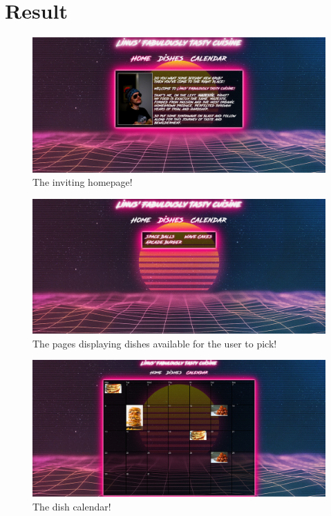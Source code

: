 \documentclass[a4paper]{scrartcl}
\begin{document}
\section{Result}
\begin{figure}[H]
  \begin{center}
    \includegraphics[scale=0.3]{Scr1.jpg}
    \caption{The inviting homepage!}
    \label{fig:homepage}
  \end{center}
\end{figure}

\begin{figure}[H]
  \begin{center}
    \includegraphics[scale=0.3]{Scr2.jpg}
    \caption{The pages displaying dishes available for the user to pick!}
    \label{fig:dishes}
  \end{center}
\end{figure}

\begin{figure}[H]
  \begin{center}
    \includegraphics[scale=0.2]{Scr3.jpg}
    \caption{The dish calendar!}
    \label{fig:calendar}
  \end{center}
\end{figure}
\end{document}
